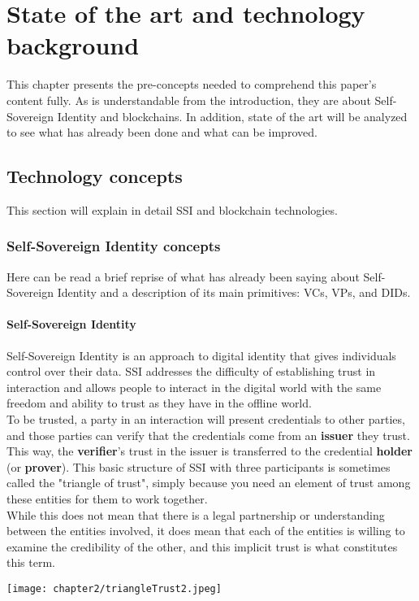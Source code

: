 
\chapter{State of the art and technology background}
This chapter presents the pre-concepts needed to comprehend this paper's content fully.
As is understandable from the introduction, they are about Self-Sovereign Identity and 
blockchains. In addition, state of the art will be analyzed to see what has already been
done and what can be improved.
\section{Technology concepts}
This section will explain in detail SSI and blockchain technologies.
\subsection{Self-Sovereign Identity concepts}
Here can be read a brief reprise of what has already been saying about Self-Sovereign 
Identity and a description of its main primitives: VCs, VPs, and DIDs.
\subsubsection{Self-Sovereign Identity}
Self-Sovereign Identity is an approach to digital identity that gives individuals 
control over their data. SSI addresses the difficulty of establishing trust in 
interaction and allows people to interact in the digital world with the same freedom 
and ability to trust as they have in the offline world.
\vspace*{0.3cm}\\
To be trusted, a party in an interaction will present credentials to other parties, 
and those parties can verify that the credentials come from an \textbf{issuer} they trust.
This way, the \textbf{verifier}'s trust in the issuer is transferred to the credential 
\textbf{holder} (or \textbf{prover}). This basic structure of SSI with three participants 
is sometimes called the "triangle of trust"\cite{site:trusttriangle}, simply because you need an element of trust
among these entities for them to work together.
\vspace*{0.3cm}\\
While this does not mean that there is a legal partnership or understanding between the 
entities involved, it does mean that each of the entities is willing to examine the 
credibility of the other, and this implicit trust is what constitutes this term.
\begin{center}
    \texttt{[image: chapter2/triangleTrust2.jpeg]}
\end{center}
